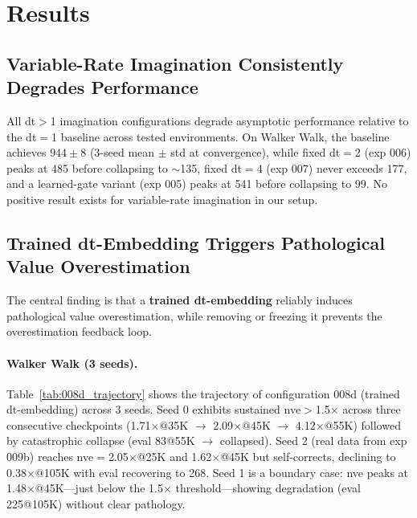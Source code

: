 \documentclass[letterpaper]{article}
\begin{document}
\section{Results}
\label{sec:results}

\subsection{Variable-Rate Imagination Consistently Degrades Performance}
\label{sec:results_degradation}

All dt$>$1 imagination configurations degrade asymptotic performance relative to the dt$=$1 baseline across tested environments.
On Walker Walk, the baseline achieves $944 \pm 8$ (3-seed mean $\pm$ std at convergence), while fixed dt$=$2 (exp 006) peaks at 485 before collapsing to $\sim$135, fixed dt$=$4 (exp 007) never exceeds 177, and a learned-gate variant (exp 005) peaks at 541 before collapsing to 99.
No positive result exists for variable-rate imagination in our setup.

\subsection{Trained dt-Embedding Triggers Pathological Value Overestimation}
\label{sec:results_c2}

The central finding is that a \textbf{trained dt-embedding} reliably induces pathological value overestimation, while removing or freezing it prevents the overestimation feedback loop.

\paragraph{Walker Walk (3 seeds).}
Table~\ref{tab:008d_trajectory} shows the trajectory of configuration 008d (trained dt-embedding) across 3 seeds.
Seed 0 exhibits sustained nve$>$1.5$\times$ across three consecutive checkpoints (1.71$\times$@35K $\to$ 2.09$\times$@45K $\to$ 4.12$\times$@55K) followed by catastrophic collapse (eval 83@55K $\to$ collapsed).
Seed 2 (real data from exp 009b) reaches nve$=$2.05$\times$@25K and 1.62$\times$@45K but self-corrects, declining to 0.38$\times$@105K with eval recovering to 268.
Seed 1 is a boundary case: nve peaks at 1.48$\times$@45K---just below the 1.5$\times$ threshold---showing degradation (eval 225@105K) without clear pathology.
\end{document}
